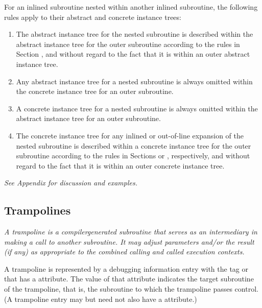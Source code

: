 For an inlined subroutine nested within another inlined
subroutine, the following rules apply to their abstract and
concrete instance trees:

\begin{enumerate}[1. ]
\item The abstract instance tree for the nested subroutine is
described within the abstract instance tree for the outer
subroutine according to the rules in
Section , and
without regard to the fact that it is within an outer abstract
instance tree.

\item Any abstract instance tree for a nested subroutine is
always omitted within the concrete instance tree for an
outer subroutine.

\item  A concrete instance tree for a nested subroutine is
always omitted within the abstract instance tree for an
outer subroutine.

\item The concrete instance tree for any inlined or
out-of-line
expansion of the nested subroutine is described within a
concrete instance tree for the outer subroutine according
to the rules in
Sections  or
, respectively,
and without regard to the fact that it is within an outer
concrete instance tree.
\end{enumerate}

\textit{See Appendix 
for discussion and examples.}

\subsection{Trampolines}
\label{chap:trampolines}

\textit{A trampoline is a compiler\dash generated subroutine that serves
as\hypertarget{chap:DWATtrampolinetargetsubroutine}{}
an intermediary in making a call to another subroutine. It may
adjust parameters and/or the result (if any) as appropriate
to the combined calling and called execution contexts.}

A trampoline is represented by a debugging information entry
with the tag \DWTAGsubprogram{} or \DWTAGinlinedsubroutine{}
that has
a \DWATtrampolineDEFN{} attribute.
The value of that
attribute indicates the target subroutine of the trampoline,
that is, the subroutine to which the trampoline passes
control. (A trampoline entry may but need not also have a
\DWATartificial{} attribute.)


